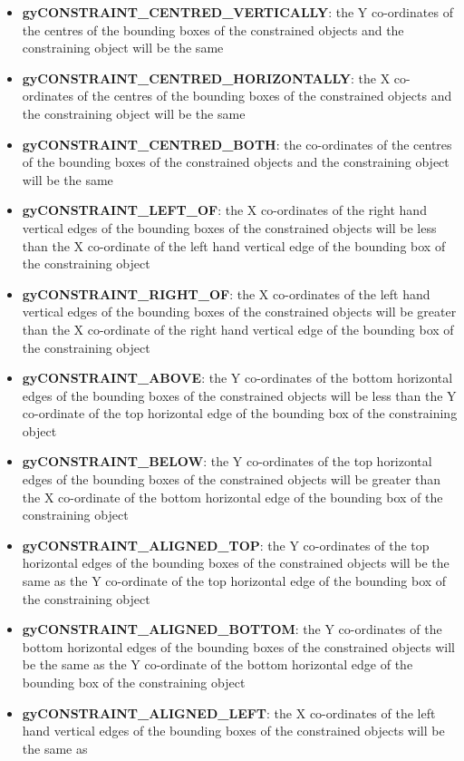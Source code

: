 \begin{itemize}\itemsep=0pt
\item {\bf gyCONSTRAINT\_CENTRED\_VERTICALLY}: the Y co-ordinates of the centres of the
bounding boxes of the constrained objects and the constraining object
will be the same
\item {\bf gyCONSTRAINT\_CENTRED\_HORIZONTALLY}: the X co-ordinates of the centres of the
bounding boxes of the constrained objects and the constraining object
will be the same
\item {\bf gyCONSTRAINT\_CENTRED\_BOTH}: the co-ordinates of the centres of the bounding boxes
of the constrained objects and the constraining object will be the same
\item {\bf gyCONSTRAINT\_LEFT\_OF}: the X co-ordinates of the right hand vertical edges
of the bounding boxes of the constrained objects will be less than
the X co-ordinate of the left hand vertical edge of the bounding box
of the constraining object
\item {\bf gyCONSTRAINT\_RIGHT\_OF}: the X co-ordinates of the left hand vertical edges
of the bounding boxes of the constrained objects will be greater than
the X co-ordinate of the right hand vertical edge of the bounding box
of the constraining object
\item {\bf gyCONSTRAINT\_ABOVE}: the Y co-ordinates of the bottom horizontal edges of the
bounding boxes of the constrained objects will be less than the
Y co-ordinate of the top horizontal edge of the bounding box of the
constraining object
\item {\bf gyCONSTRAINT\_BELOW}: the Y co-ordinates of the top horizontal edges of the
bounding boxes of the constrained objects will be greater than
the X co-ordinate of the bottom horizontal edge of the bounding box
of the constraining object
\item {\bf gyCONSTRAINT\_ALIGNED\_TOP}: the Y co-ordinates of the top horizontal edges of the
bounding boxes of the constrained objects will be the same as the
Y co-ordinate of the top horizontal edge of the bounding box of the
constraining object
\item {\bf gyCONSTRAINT\_ALIGNED\_BOTTOM}: the Y co-ordinates of the bottom horizontal edges
of the bounding boxes of the constrained objects will be the same as
the Y co-ordinate of the bottom horizontal edge of the bounding box
of the constraining object
\item {\bf gyCONSTRAINT\_ALIGNED\_LEFT}: the X co-ordinates of the left hand vertical edges
of the bounding boxes of the constrained objects will be the same as

\end{itemize}
